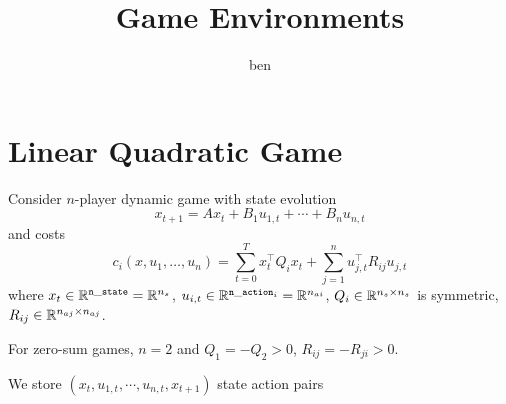 \documentclass{article}
\title{Game Environments}
\author{ben}
\begin{document}
\maketitle

\section{Linear Quadratic Game}

Consider $n$-player dynamic game with state evolution
\[
x_{t+1} = Ax_t + B_1 u_{1,t} + \cdots + B_n u_{n,t}
\]
and costs
\[
c_i(x,u_1,\dots,u_n) = \sum_{t=0}^T x_t^\top Q_i x_t + \sum_{j=1}^n u_{j,t}^\top R_{ij} u_{j,t}
\]
where 
$x_t \in\mathbb{R}^{\tt n\_state}=\mathbb{R}^{n_s}$, 
$u_{i,t}\in \mathbb{R}^{{\tt n\_action}_i}=\mathbb{R}^{n_{ai}}$, 
$Q_i \in \mathbb{R}^{n_s\times n_s}$ is symmetric,
$R_{ij} \in \mathbb{R}^{n_{aj}\times n_{aj}}$.

For zero-sum games, $n=2$ and $Q_1=-Q_2 > 0$, $R_{ij} = -R_{ji} > 0 $.

We store $(x_t, u_{1,t}, \cdots, u_{n,t}, x_{t+1})$ state action pairs
\end{document}
